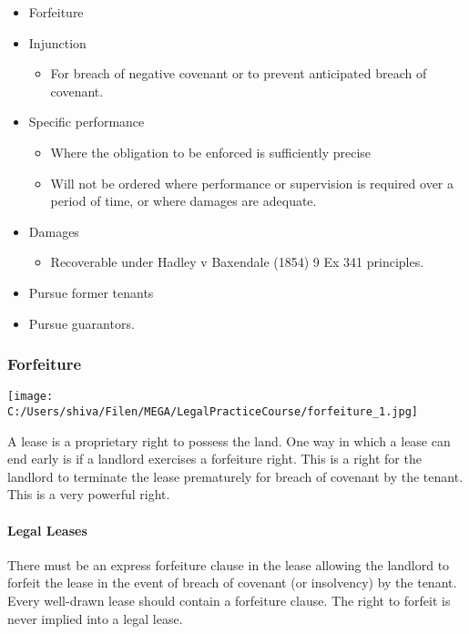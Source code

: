\documentclass[
]{article}
\providecommand{\tightlist}{%
  \setlength{\itemsep}{0pt}\setlength{\parskip}{0pt}}
\begin{document}
\begin{itemize}
\tightlist
\item
  Forfeiture
\item
  Injunction

  \begin{itemize}
  \tightlist
  \item
    For breach of negative covenant or to prevent anticipated breach of
    covenant.
  \end{itemize}
\item
  Specific performance

  \begin{itemize}
  \tightlist
  \item
    Where the obligation to be enforced is sufficiently precise
  \item
    Will not be ordered where performance or supervision is required
    over a period of time, or where damages are adequate.
  \end{itemize}
\item
  Damages

  \begin{itemize}
  \tightlist
  \item
    Recoverable under Hadley v Baxendale (1854) 9 Ex 341 principles.
  \end{itemize}
\item
  Pursue former tenants
\item
  Pursue guarantors.
\end{itemize}

\hypertarget{forfeiture-1}{%
\subsubsection{Forfeiture}\label{forfeiture-1}}

\texttt{[image: C:/Users/shiva/Filen/MEGA/LegalPracticeCourse/forfeiture\_1.jpg]}

A lease is a proprietary right to possess the land. One way in which a
lease can end early is if a landlord exercises a forfeiture right. This
is a right for the landlord to terminate the lease prematurely for
breach of covenant by the tenant. This is a very powerful right.

\hypertarget{legal-leases}{%
\paragraph{Legal Leases}\label{legal-leases}}

There must be an express forfeiture clause in the lease allowing the
landlord to forfeit the lease in the event of breach of covenant (or
insolvency) by the tenant. Every well-drawn lease should contain a
forfeiture clause. The right to forfeit is never implied into a legal
lease.
\end{document}
